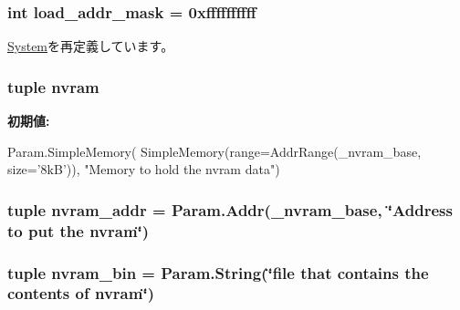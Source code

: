 \label{classSparcSystem_1_1SparcSystem_a07e6b2d2275f41491b1c95fd0a4641b2}
\hypertarget{classSparcSystem_1_1SparcSystem_abd9c5cc6b7da624a69344d571bab1038}{
\subsubsection[{load\_\-addr\_\-mask}]{\setlength{\rightskip}{0pt plus 5cm}int load\_\-addr\_\-mask = 0xffffffffff}}
\label{classSparcSystem_1_1SparcSystem_abd9c5cc6b7da624a69344d571bab1038}


\hyperlink{classSystem_1_1System_ae97427a4073448718c4d7c3df3b53143}{System}を再定義しています。\hypertarget{classSparcSystem_1_1SparcSystem_a4e6636544da22895e90d5de8d019d349}{
\subsubsection[{nvram}]{\setlength{\rightskip}{0pt plus 5cm}tuple {\bf nvram}}}
\label{classSparcSystem_1_1SparcSystem_a4e6636544da22895e90d5de8d019d349}
{\bfseries 初期値:}
\begin{DoxyCode}
Param.SimpleMemory(
        SimpleMemory(range=AddrRange(_nvram_base, size='8kB')),
        "Memory to hold the nvram data")
\end{DoxyCode}
\hypertarget{classSparcSystem_1_1SparcSystem_aaef9d4cdf47e941ffd2f34e78bbc7532}{
\subsubsection[{nvram\_\-addr}]{\setlength{\rightskip}{0pt plus 5cm}tuple nvram\_\-addr = {\bf Param.Addr}(\_\-nvram\_\-base, \char`\"{}Address to put the {\bf nvram}\char`\"{})}}
\label{classSparcSystem_1_1SparcSystem_aaef9d4cdf47e941ffd2f34e78bbc7532}
\hypertarget{classSparcSystem_1_1SparcSystem_a55a83092d14516c005d89ee782768dbb}{
\subsubsection[{nvram\_\-bin}]{\setlength{\rightskip}{0pt plus 5cm}tuple nvram\_\-bin = Param.String(\char`\"{}file that contains the {\bf contents} of {\bf nvram}\char`\"{})}}
